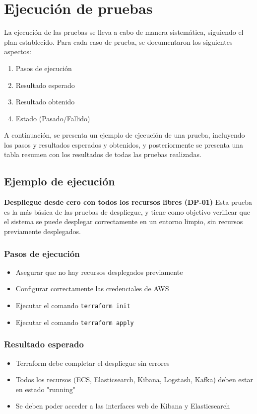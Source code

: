 \newpage{}
\section{Ejecución de pruebas}
La ejecución de las pruebas se lleva a cabo de manera sistemática, siguiendo
el plan establecido. Para cada caso de prueba, se documentaron los siguientes
aspectos:

\begin{enumerate}
    \item Pasos de ejecución
    \item Resultado esperado
    \item Resultado obtenido
    \item Estado (Pasado/Fallido)
\end{enumerate}

A continuación, se presenta un ejemplo de ejecución de una prueba, incluyendo
los pasos y resultados esperados y obtenidos, y posteriormente se presenta una
tabla resumen con los resultados de todas las pruebas realizadas.


\newpage{}
\subsection{Ejemplo de ejecución}
\textbf{Despliegue desde cero con todos los recursos libres (DP-01)}
Esta prueba es la más básica de las pruebas de despliegue, y tiene como
objetivo verificar que el sistema se puede desplegar correctamente en un
entorno limpio, sin recursos previamente desplegados.

\subsubsection{Pasos de ejecución}
\begin{itemize}
    \item Asegurar que no hay recursos desplegados previamente
    \item Configurar correctamente las credenciales de AWS
    \item Ejecutar el comando \texttt{terraform init}
    \item Ejecutar el comando \texttt{terraform apply}
\end{itemize}

\subsubsection{Resultado esperado}
\begin{itemize}
    \item Terraform debe completar el despliegue sin errores
    \item Todos los recursos (ECS, Elasticsearch, Kibana, Logstash, Kafka)
    deben estar en estado "running"
    \item Se deben poder acceder a las interfaces web de Kibana y Elasticsearch
\end{itemize}

